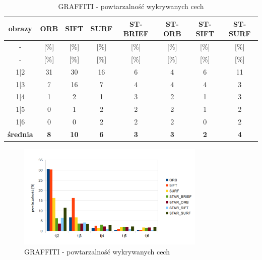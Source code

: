 \begin{table}[htbp]
  \centering
  \caption{GRAFFITI - powtarzalność wykrywanych cech}
    \begin{tabular}{|c|c|c|c|c|c|c|c|}\hline

    obrazy & \textbf{ORB} & \textbf{SIFT} & \textbf{SURF} & \textbf{ST-BRIEF} & \textbf{ST-ORB} & \textbf{ST-SIFT} & \textbf{ST-SURF} \\\hline

    -  & [\%] & [\%] & [\%] & [\%] & [\%] & [\%] & [\%] \\\hline
    - & [\%] & [\%] & [\%] & [\%] & [\%] & [\%] & [\%] \\
    1|2 & 31 & 30 & 16 & 6 & 4 & 6 & 11 \\
    1|3 & 7 & 16 & 7 & 4 & 4 & 4 & 3 \\
    1|4 & 1 & 2 & 1 & 3 & 2 & 1 & 3 \\
    1|5 & 0 & 1 & 2 & 2 & 2 & 1 & 2 \\
    1|6 & 0 & 0 & 2 & 2 & 2 & 0 & 2 \\\hline
    \textbf{średnia} & \textbf{8} & \textbf{10} & \textbf{6} & \textbf{3} & \textbf{3} & \textbf{2} & \textbf{4} \\\hline
    
    \end{tabular}%
  \label{tab:graffiti_m1}%
\end{table}%


\begin{figure}
\centering
\includegraphics[width=0.8\textwidth]{pict/mikolajczyk/graff/m1.png}
\caption{GRAFFITI - powtarzalność wykrywanych cech}
\end{figure}

